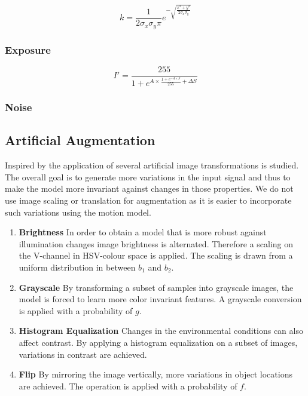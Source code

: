 \begin{equation}
 k = \frac{1}{2\sigma_x\sigma_y\pi}e^{-\sqrt{\frac{x^2 + y^2}{2\sigma_x\sigma_y}}} 
\end{equation}


\subsubsection{Exposure}

\begin{equation}
	I' = \frac{255}{1 + e^{A \times \frac{1 + e^{-A \times S}}{255} + \Delta S}}
\end{equation}


\subsubsection{Noise}


\subsection{Artificial Augmentation}

Inspired by \cite{Howard2013, Redmon, Liu} the application of several artificial image transformations is studied. The overall goal is to generate more variations in the input signal and thus to make the model more invariant against changes in those properties. We do not use image scaling or translation for augmentation as it is easier to incorporate such variations using the motion model.

\begin{enumerate}
	\item \textbf{Brightness} In order to obtain a model that is more robust against illumination changes image brightness is alternated. Therefore a scaling on the V-channel in HSV-colour space is applied. The scaling is drawn from a uniform distribution in between $b_1$ and $b_2$.
	
	\item \textbf{Grayscale} By transforming a subset of samples into grayscale images, the model is forced to learn more color invariant features. A grayscale conversion is applied with a probability of $g$.
	
	\item \textbf{Histogram Equalization} Changes in the environmental conditions can also affect contrast. By applying a histogram equalization on a subset of images, variations in contrast are achieved. 
	
	\item \textbf{Flip} By mirroring the image vertically, more variations in object locations are achieved. The operation is applied with a probability of $f$.
\end{enumerate}


